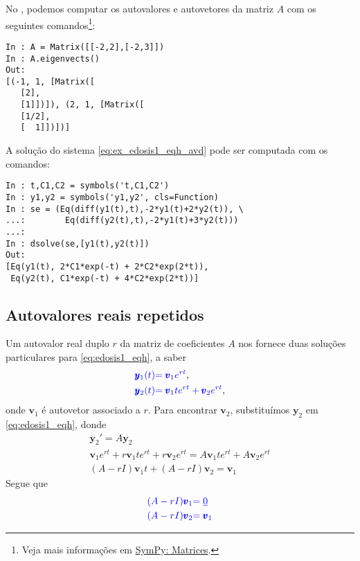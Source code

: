 \begin{ex}
\ifispython
No \python, podemos computar os autovalores e autovetores da matriz $A$ com os seguintes comandos\footnote{Veja mais informações em \href{https://docs.sympy.org/latest/tutorial/matrices.html}{SymPy: Matrices}.}:
\begin{verbatim}
In : A = Matrix([[-2,2],[-2,3]])
In : A.eigenvects()
Out: 
[(-1, 1, [Matrix([
   [2],
   [1]])]), (2, 1, [Matrix([
   [1/2],
   [  1]])])]
\end{verbatim}

A solução do sistema \eqref{eq:ex_edosis1_eqh_avd} pode ser computada com os comandos:
\begin{verbatim}
In : t,C1,C2 = symbols('t,C1,C2')
In : y1,y2 = symbols('y1,y2', cls=Function)
In : se = (Eq(diff(y1(t),t),-2*y1(t)+2*y2(t)), \
...:        Eq(diff(y2(t),t),-2*y1(t)+3*y2(t)))
...: 
In : dsolve(se,[y1(t),y2(t)])
Out: 
[Eq(y1(t), 2*C1*exp(-t) + 2*C2*exp(2*t)),
 Eq(y2(t), C1*exp(-t) + 4*C2*exp(2*t))]
\end{verbatim}
\fi
\end{ex}

\subsection{Autovalores reais repetidos}\label{subsec:edosis1_eqh_avr}

Um autovalor real duplo $r$ da matriz de coeficientes $A$ nos fornece duas soluções particulares para \eqref{eq:edosis1_eqh}, a saber
\begin{align}
  {\color{blue}\pmb{y}_1(t)} &{\color{blue}= \pmb{v}_1e^{rt}},\\
  {\color{blue}\pmb{y}_2(t)} &{\color{blue}= \pmb{v}_1te^{rt} + \pmb{v}_2e^{rt}},
\end{align}
onde $\pmb{v}_1$ é autovetor associado a $r$. Para encontrar $\pmb{v}_2$, substituímos $\pmb{y}_2$ em \eqref{eq:edosis1_eqh}, donde
\begin{gather}
  \pmb{y}_2' = A\pmb{y}_2 \\
  \pmb{v}_1e^{rt} + r\pmb{v}_1te^{rt} + r\pmb{v}_2e^{rt} = A\pmb{v}_1te^{rt} + A\pmb{v}_2e^{rt} \\
  (A-rI)\pmb{v}_1t + (A-rI)\pmb{v}_2 = \pmb{v}_1
\end{gather}
Segue que
\begin{align}
  {\color{blue}(A-rI)\pmb{v}_1} &{\color{blue}= \underline{0}} \\
  {\color{blue}(A-rI)\pmb{v}_2} &{\color{blue}= \pmb{v}_1}
\end{align}

